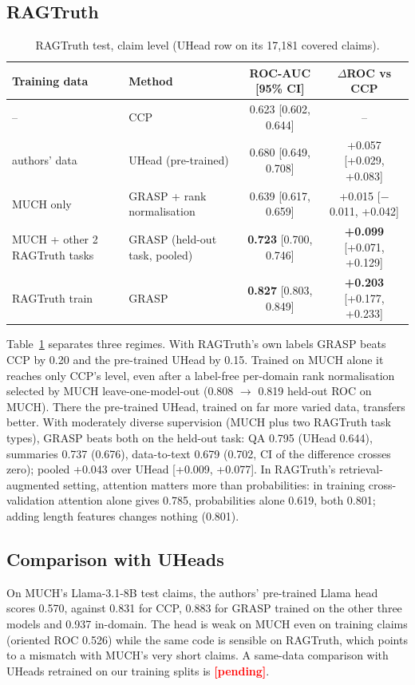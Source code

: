 \documentclass[11pt]{article}
\newcommand{\pending}{\textcolor{red}{\textbf{[pending]}}}
\begin{document}
\subsection{RAGTruth}
\begin{table}[t]
\centering\small
\begin{tabular}{llcc}
\toprule
Training data & Method & ROC-AUC [95\% CI] & $\Delta$ROC vs CCP \\
\midrule
-- & CCP & 0.623 [0.602, 0.644] & -- \\
authors' data & UHead (pre-trained) & 0.680 [0.649, 0.708] & +0.057 [+0.029, +0.083] \\
MUCH only & GRASP + rank normalisation & 0.639 [0.617, 0.659] & +0.015 [$-$0.011, +0.042] \\
MUCH + other 2 RAGTruth tasks & GRASP (held-out task, pooled) & \textbf{0.723} [0.700, 0.746] & \textbf{+0.099} [+0.071, +0.129] \\
RAGTruth train & GRASP & \textbf{0.827} [0.803, 0.849] & \textbf{+0.203} [+0.177, +0.233] \\
\bottomrule
\end{tabular}
\caption{RAGTruth test, claim level (UHead row on its 17,181 covered claims).}
\label{tab:rag}
\end{table}
Table~\ref{tab:rag} separates three regimes. With RAGTruth's own labels GRASP beats CCP by 0.20 and
the pre-trained UHead by 0.15. Trained on MUCH alone it reaches only CCP's level, even after a
label-free per-domain rank normalisation selected by MUCH leave-one-model-out (0.808 $\to$ 0.819
held-out ROC on MUCH). There the pre-trained UHead, trained on far more varied data, transfers better.
With moderately diverse supervision (MUCH plus two RAGTruth task types), GRASP beats both on the
held-out task: QA 0.795 (UHead 0.644), summaries 0.737 (0.676), data-to-text 0.679 (0.702, CI of the
difference crosses zero); pooled +0.043 over UHead [+0.009, +0.077]. In RAGTruth's
retrieval-augmented setting, attention matters more than probabilities: in training cross-validation
attention alone gives 0.785, probabilities alone 0.619, both 0.801; adding length features changes nothing (0.801).

\subsection{Comparison with UHeads}
\label{sec:uheads}
On MUCH's Llama-3.1-8B test claims, the authors' pre-trained Llama head scores 0.570, against 0.831
for CCP, 0.883 for GRASP trained on the other three models and 0.937 in-domain. The head is weak on
MUCH even on training claims (oriented ROC 0.526) while the same code is sensible on RAGTruth, which
points to a mismatch with MUCH's very short claims. A same-data comparison with UHeads retrained on
our training splits is \pending{}.
\end{document}
